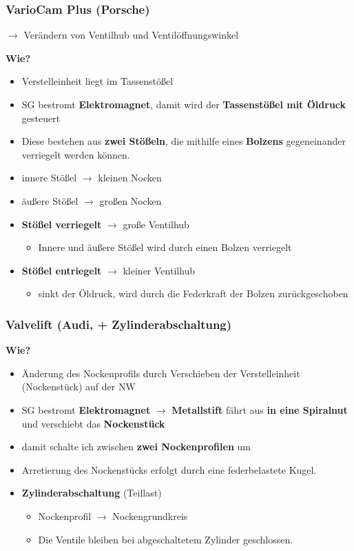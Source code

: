\subsubsection{VarioCam Plus (Porsche)}\label{variocam-plus-porsche}

$\to$ Verändern von Ventilhub und Ventilöffnungswinkel

\textbf{Wie?}

\begin{itemize}
\item
  Verstelleinheit liegt im Tassenstößel
\item
  SG bestromt \textbf{Elektromagnet}, damit wird der
  \textbf{Tassenstößel mit Öldruck} gesteuert
\item
  Diese bestehen aus \textbf{zwei Stößeln}, die mithilfe eines
  \textbf{Bolzens} gegeneinander verriegelt werden können.
\item
  innere Stößel $\to$ kleinen Nocken
\item
  äußere Stößel $\to$ großen Nocken
\item
  \textbf{Stößel verriegelt} $\to$ große Ventilhub

  \begin{itemize}
  \item
    Innere und äußere Stößel wird durch einen Bolzen verriegelt
  \end{itemize}
\item
  \textbf{Stößel entriegelt} $\to$ kleiner Ventilhub

  \begin{itemize}
  \item
    sinkt der Öldruck, wird durch die Federkraft der Bolzen
    zurückgeschoben
  \end{itemize}
\end{itemize}

\subsubsection{Valvelift (Audi, +
Zylinderabschaltung)}\label{valvelift-audi-zylinderabschaltung}

\textbf{Wie?}

\begin{itemize}
\item
  Änderung des Nockenprofils durch Verschieben der Verstelleinheit
  (Nockenstück) auf der NW
\item
  SG bestromt \textbf{Elektromagnet} $\to$ \textbf{Metallstift} fährt
  aus \textbf{in eine Spiralnut} und verschiebt das \textbf{Nockenstück}
\item
  damit schalte ich zwischen \textbf{zwei Nockenprofilen} um
\item
  Arretierung des Nockenstücks erfolgt durch eine federbelastete Kugel.
\item
  \textbf{Zylinderabschaltung} (Teillast)

  \begin{itemize}
  \item
    Nockenprofil $\to$ Nockengrundkreis
  \item
    Die Ventile bleiben bei abgeschaltetem Zylinder geschlossen.
  \end{itemize}
\end{itemize}

